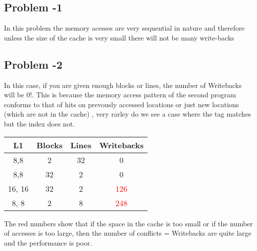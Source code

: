 \subsection{Problem -1}
In this problem the memory acesses are very sequential in nature and therefore unless the size of the cache is very small there will not be many write-backs
\subsection{Problem -2}
In this case, if you are given enough blocks or lines, the number of Writebacks will be 0!. This is because the memory access pattern of the second program conforms to that of 
hits on prevously accessed locations or just new locations (which are not in the cache) , very rarley do we see  a case where the tag matches but the index does not.
\\
\begin{center}
\begin{tabular}{c | c | c | c}
L1 & Blocks & Lines & Writebacks\\
\hline
8,8 & 2 & 32 & 0\\
\hline
8,8 & 32 & 2 & 0\\
\hline
16, 16 & 32 & 2 & \textcolor{red}{126}\\
\hline
8, 8 & 2 & 8 & \textcolor{red}{248}\\
\hline
\end{tabular}
\end{center}
The red numbers show that if the space in the cache is too small  or if the number of accesses is too large, then the number of conflicts  = Writebacks are quite large and the performance is poor.

